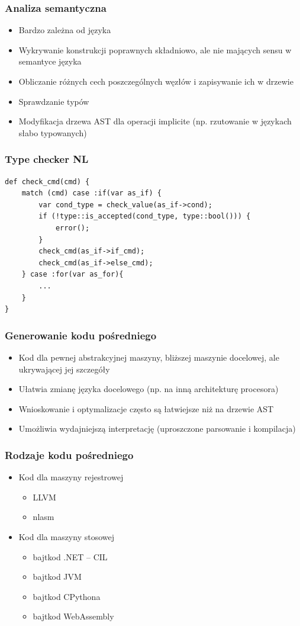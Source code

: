 \documentclass{beamer}
\begin{document}
	\begin{frame}
		\frametitle{Analiza semantyczna}
		\begin{itemize}
			\item Bardzo zależna od języka
			\item Wykrywanie konstrukcji poprawnych składniowo, ale nie mających sensu w semantyce języka
			\item Obliczanie różnych cech poszczególnych węzłów i zapisywanie ich w drzewie
			\item Sprawdzanie typów
			\item Modyfikacja drzewa AST dla operacji implicite (np. rzutowanie w językach słabo typowanych)
		\end{itemize}
	\end{frame}
	
	\begin{frame}[fragile]
		\frametitle{Type checker NL}
		\begin{lstlisting}[language=nl]
def check_cmd(cmd) {
	match (cmd) case :if(var as_if) {
		var cond_type = check_value(as_if->cond);
		if (!type::is_accepted(cond_type, type::bool())) {
			error();
		}
		check_cmd(as_if->if_cmd);
		check_cmd(as_if->else_cmd);
	} case :for(var as_for){
		...
	}
}
		\end{lstlisting}
	\end{frame}
	
	\begin{frame}
		\frametitle{Generowanie kodu pośredniego}
		\begin{itemize}
			\item Kod dla pewnej abstrakcyjnej maszyny, bliższej maszynie docelowej, ale ukrywającej jej szczegóły
			\item Ułatwia zmianę języka docelowego (np. na inną architekturę procesora)
			\item Wnioskowanie i optymalizacje często są łatwiejsze niż na drzewie AST
			\item Umożliwia wydajniejszą interpretację (uproszczone parsowanie i kompilacja)
		\end{itemize}
	\end{frame}
	
	\begin{frame}
		\frametitle{Rodzaje kodu pośredniego}
		\begin{itemize}
			\item Kod dla maszyny rejestrowej
				\begin{itemize}
					\item LLVM
					\item nlasm
				\end{itemize}
			\item Kod dla maszyny stosowej
				\begin{itemize}
					\item bajtkod .NET -- CIL
					\item bajtkod JVM
					\item bajtkod CPythona
					\item bajtkod WebAssembly
				\end{itemize}
		\end{itemize}
	\end{frame}
	
\end{document}
